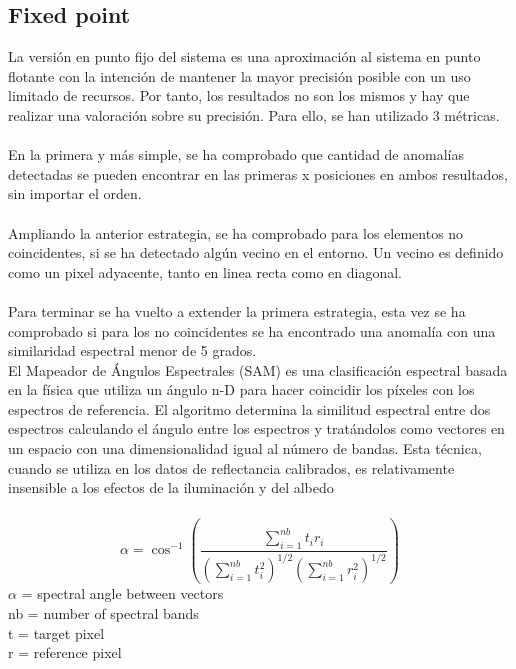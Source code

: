 \subsection{Fixed point}
La versión en punto fijo del sistema es una aproximación al sistema en punto flotante con la intención de mantener la mayor precisión posible con un uso limitado de recursos.
Por tanto, los resultados no son los mismos y hay que realizar una valoración sobre su precisión. Para ello, se han utilizado 3 métricas.
\\
\\
En la primera y más simple, se ha comprobado que cantidad de anomalías detectadas se pueden encontrar en las primeras x posiciones en ambos resultados, sin importar el orden.
\\
\\
Ampliando la anterior estrategia, se ha comprobado para los elementos no coincidentes, si se ha detectado algún vecino en el entorno. Un vecino es definido como un pixel adyacente, tanto en linea recta como en diagonal.
\\
\\
Para terminar se ha vuelto a extender la primera estrategia, esta vez se ha comprobado si para los no coincidentes se ha encontrado una anomalía con una similaridad espectral menor de 5 grados.
\\
El Mapeador de Ángulos Espectrales (SAM) es una clasificación espectral basada en la física que utiliza un ángulo n-D para hacer coincidir los píxeles con los espectros de referencia. El algoritmo determina la similitud espectral entre dos espectros calculando el ángulo entre los espectros y tratándolos como vectores en un espacio con una dimensionalidad igual al número de bandas. Esta técnica, cuando se utiliza en los datos de reflectancia calibrados, es relativamente insensible a los efectos de la iluminación y del albedo
\\
\\
\[\alpha = \cos^{-1}\left ( \frac{\sum\limits^{nb}_{i=1}{t_{i}r_{i}}}{\left ( \sum\limits^{nb}_{i=1}{t_{i}^2} \right )^{1/2}\left ( \sum\limits^{nb}_{i=1}{r_{i}^2} \right )^{1/2}} \right )\]
$\alpha$ = spectral angle between vectors
\\
nb = number of spectral bands
\\
t = target pixel
\\
r = reference pixel
\\

